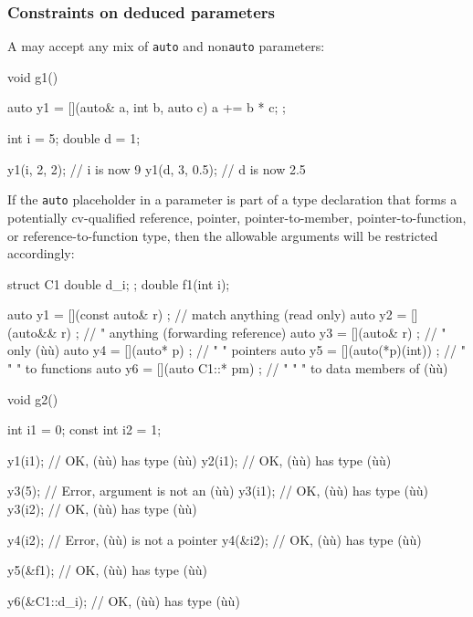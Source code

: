 \subsubsection[Constraints on deduced parameters]{Constraints on deduced parameters}\label{constraints-on-deduced-parameters}

A  may accept any mix of \lstinline!auto! and
non\lstinline!auto! parameters:

\begin{emcppslisting}[emcppsstandards={c++14}]
void g1()
{
    auto y1 = [](auto& a, int b, auto c) { a += b * c; };

    int    i = 5;
    double d = 1;

    y1(i, 2, 2);    // i is now 9
    y1(d, 3, 0.5);  // d is now 2.5
}
\end{emcppslisting}
    

\noindent If the \lstinline!auto! placeholder in a  parameter
is part of a type declaration that forms a potentially cv-qualified
reference, pointer, pointer-to-member, pointer-to-function, or
reference-to-function type, then the allowable arguments will be
restricted accordingly:

\begin{emcppslisting}[emcppsstandards={c++14}]
struct C1 { double d_i; };
double f1(int i);

auto y1 = [](const auto& r) { };  // match anything (read only)
auto y2 = [](auto&& r)      { };  //   "   anything (forwarding reference)
auto y3 = [](auto& r)       { };  //   "   only (ù{}ù)
auto y4 = [](auto* p)       { };  //   "     "  pointers
auto y5 = [](auto(*p)(int)) { };  //   "     "      "    to functions
auto y6 = [](auto C1::* pm) { };  //   "     "      "    to data members of (ù{}ù)

void g2()
{
    int       i1 = 0;
    const int i2 = 1;

    y1(i1);        // OK, (ù{}ù) has type (ù{}ù)
    y2(i1);        // OK, (ù{}ù) has type (ù{}ù)

    y3(5);         // Error, argument is not an (ù{}ù)
    y3(i1);        // OK, (ù{}ù) has type (ù{}ù)
    y3(i2);        // OK, (ù{}ù) has type (ù{}ù)

    y4(i2);        // Error, (ù{}ù) is not a pointer
    y4(&i2);       // OK, (ù{}ù) has type (ù{}ù)

    y5(&f1);       // OK, (ù{}ù) has type (ù{}ù)

    y6(&C1::d_i);  // OK, (ù{}ù) has type (ù{}ù)
}
\end{emcppslisting}
    

